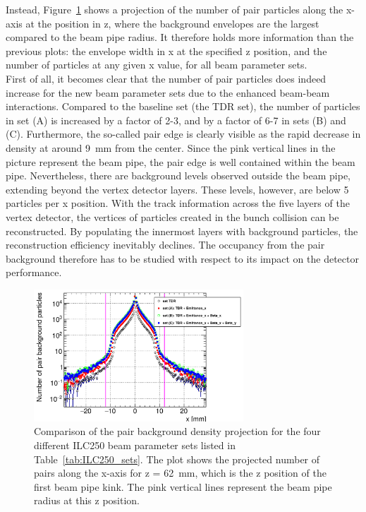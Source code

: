 Instead, Figure~\ref{fig:PairBkg:Density_Projection} shows a projection of the number of pair particles along the x-axis at the position in z, where the background envelopes are the largest compared to the beam pipe radius.
It therefore holds more information than the previous plots: the envelope width in x at the specified z position, and the number of particles at any given x value, for all beam parameter sets.
\\First of all, it becomes clear that the number of pair particles does indeed increase for the new beam parameter sets due to the enhanced beam-beam interactions.
Compared to the baseline set (the TDR set), the number of particles in set (A) is increased by a factor of 2-3, and by a factor of 6-7 in sets (B) and (C).
Furthermore, the so-called pair edge is clearly visible as the rapid decrease in density at around \SI{9}{\milli\meter} from the center.
Since the pink vertical lines in the picture represent the beam pipe, the pair edge is well contained within the beam pipe.
Nevertheless, there are background levels observed outside the beam pipe, extending beyond the vertex detector layers.
These levels, however, are below 5 particles per x position.
With the track information across the five layers of the vertex detector, the vertices of particles created in the bunch collision can be reconstructed.
By populating the innermost layers with background particles, the reconstruction efficiency inevitably declines.
The occupancy from the pair background therefore has to be studied with respect to its impact on the detector performance.
\begin{figure}
    \centering
    \includegraphics[width=0.7\textwidth]{Figures/Pairs/HelixEnvelope_Projection_Comparison_250GeV_parametersets_LEG.png}
    \caption[Pair background density projection for different ILC250 beam parameter sets]{
    Comparison of the pair background density projection for the four different ILC250 beam parameter sets listed in Table~\ref{tab:ILC250_sets}.
    The plot shows the projected number of pairs along the x-axis for z = \SI[detect-all]{62}{\milli\meter}, which is the z position of the first beam pipe kink.
    The pink vertical lines represent the beam pipe radius at this z position.
    }
    \label{fig:PairBkg:Density_Projection}
\end{figure}


